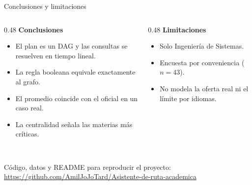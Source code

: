\documentclass[aspectratio=169,14pt]{beamer}
\begin{document}
\begin{frame}{Conclusiones y limitaciones}
\begin{columns}[T]
\begin{column}{0.48\textwidth}
\textbf{Conclusiones}
\small\begin{itemize}
\item El plan es un DAG y las consultas se resuelven en tiempo lineal.
\item La regla booleana equivale exactamente al grafo.
\item El promedio coincide con el oficial en un caso real.
\item La centralidad señala las materias más críticas.
\end{itemize}
\end{column}
\begin{column}{0.48\textwidth}
\textbf{Limitaciones}
\small\begin{itemize}
\item Solo Ingeniería de Sistemas.
\item Encuesta por conveniencia ($n=43$).
\item No modela la oferta real ni el límite por idiomas.
\end{itemize}
\end{column}
\end{columns}
\end{frame}

\begin{frame}[plain]
\vfill{}\\[8mm]
{\small Código, datos y README para reproducir el proyecto:}\\[2mm]
\url{https://github.com/AmilJoJoTard/Asistente-de-ruta-academica}
\vfill
\end{frame}
\end{document}
